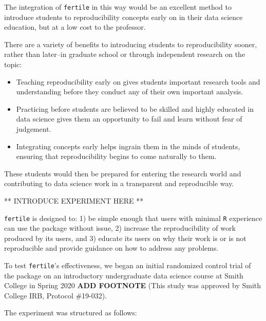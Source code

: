 \documentclass[12pt,twoside]{reedthesis}
\begin{document}
The integration of \texttt{fertile} in this way would be an excellent
method to introduce students to reproducibility concepts early on in
their data science education, but at a low cost to the professor.

There are a variety of benefits to introducing students to
reproducibility sooner, rather than later--in graduate school or through
independent research on the topic:
\begin{itemize}
\item
  Teaching reproducibility early on gives students important research
  tools and understanding before they conduct any of their own important
  analysis.
\item
  Practicing before students are believed to be skilled and highly
  educated in data science gives them an opportunity to fail and learn
  without fear of judgement.
\item
  Integrating concepts early helps ingrain them in the minds of
  students, ensuring that reproducibility begins to come naturally to
  them.
\end{itemize}
These students would then be prepared for entering the research world
and contributing to data science work in a transparent and reproducible
way.

** INTRODUCE EXPERIMENT HERE **

\texttt{fertile} is designed to: 1) be simple enough that users with
minimal \texttt{R} experience can use the package without issue, 2)
increase the reproducibility of work produced by its users, and 3)
educate its users on why their work is or is not reproducible and
provide guidance on how to address any problems.

To test \texttt{fertile}'s effectiveness, we began an initial randomized
control trial of the package on an introductory undergraduate data
science course at Smith College in Spring 2020 \textbf{ADD FOOTNOTE}
(This study was approved by Smith College IRB, Protocol \#19-032).

The experiment was structured as follows:
\end{document}
